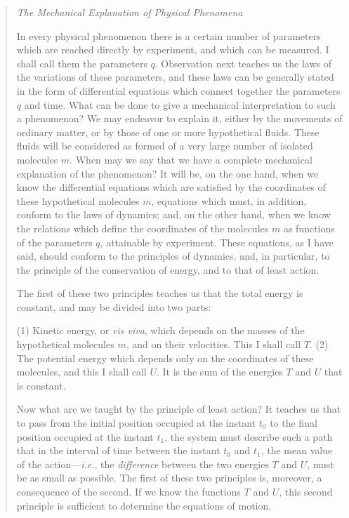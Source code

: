 \begin{quote}
    \emph{The Mechanical Explanation of Physical Phenomena}
    
    In every physical phenomenon there is a certain number of parameters which are reached directly by experiment, and which can be measured.  I shall call them the parameters $q$.  Observation next teaches us the laws of the variations of these parameters, and these laws can be generally stated in the form of differential equations which connect together the parameters $q$ and time.  What can be done to give a mechanical interpretation to such a phenomenon?  We may endeavor to explain it, either by the movements of ordinary matter, or by those of one or more hypothetical fluids.  These fluids will be considered as formed of a very large number of isolated molecules $m$.  When may we say that we have a complete mechanical explanation of the phenomenon?  It will be, on the one hand, when we know the differential equations which are satisfied by the coordinates of these hypothetical molecules $m$, equations which must, in addition, conform to the laws of dynamics; and, on the other hand, when we know the relations which define the coordinates of the molecules $m$ as functions of the parameters $q$, attainable by experiment.  These equations, as I have said, should conform to the principles of dynamics, and, in particular, to the principle of the conservation of energy, and to that of least action.  
    
    The first of these two principles teaches us that the total energy is constant, and may be divided into two parts:
    
    (1) Kinetic energy, or \emph{vis viva}, which depends on the masses of the hypothetical molecules $m$, and on their velocities.  This I shall call $T$.  (2) The potential energy which depends only on the coordinates of these molecules, and this I shall call $U$.  It is the sum of the energies $T$ and $U$ that is constant.
    
    Now what are we taught by the principle of least action?  It teaches us that to pass from the initial position occupied at the instant $t_0$ to the final position occupied at the instant $t_1$, the system must describe such a path that in the interval of time between the instant $t_0$ and $t_1$, the mean value of the action---\emph{i.e.}, the \emph{difference} between the two energies $T$ and $U$, must be as small as possible.  The first of these two principles is, moreover, a consequence of the second.  If we know the functions $T$ and $U$, this second principle is sufficient to determine the equations of motion.  
    

\end{quote}
